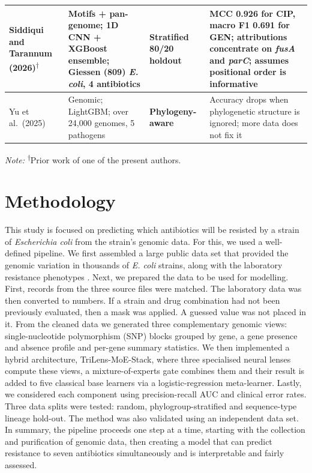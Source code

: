 \documentclass[journal]{IEEEtran}
\begin{document}
\begin{table}[!tb]
\begin{tabular}{|>{\raggedright\arraybackslash}p{2.6cm}|>{\raggedright\arraybackslash}p{4.6cm}|>{\raggedright\arraybackslash}p{2.6cm}|>{\raggedright\arraybackslash}p{6.4cm}|}
Siddiqui and Tarannum (2026)\textsuperscript{$\dagger$} \cite{siddiqui2025amrensemble} & Motifs + pan-genome; 1D CNN + XGBoost ensemble; Giessen (809) \textit{E. coli}, 4 antibiotics & Stratified 80/20 holdout & MCC 0.926 for CIP, macro F1 0.691 for GEN; attributions concentrate on \textit{fusA} and \textit{parC}; assumes positional order is informative \\ \hline
Yu et al.\ (2025) \cite{Yu2025} & Genomic; LightGBM; over 24,000 genomes, 5 pathogens & \textbf{Phylogeny-aware} & Accuracy drops when phylogenetic structure is ignored; more data does not fix it \\ \hline
\end{tabular}
\renewcommand{\arraystretch}{1.0}
\vspace{0.4em}

\noindent\footnotesize\textit{Note:} \textsuperscript{$\dagger$}Prior work of one of
the present authors.
\end{table}

\section{Methodology}
\label{sec:method}

This study is focused on predicting which antibiotics will be resisted by a strain
of \textit{Escherichia coli} from the strain's genomic data. For this, we used a
well-defined pipeline. We first assembled a large public data set that provided the
genomic variation in thousands of \textit{E. coli} strains, along with the
laboratory resistance phenotypes \cite{morin2024ecoli,york2025amr}. Next, we prepared the data to
be used for modelling. First, records from the three source files were matched. The
laboratory data was then converted to numbers. If a strain and drug combination had
not been previously evaluated, then a mask was applied. A guessed value was not
placed in it. From the cleaned data we generated three complementary genomic views:
single-nucleotide polymorphism (SNP) blocks grouped by gene, a gene presence and
absence profile and per-gene summary statistics. We then implemented a hybrid
architecture, TriLens-MoE-Stack, where three specialised neural lenses compute
these views, a mixture-of-experts gate combines them and their result is added to
five classical base learners via a logistic-regression meta-learner. Lastly, we
considered each component using precision-recall AUC and clinical error rates.
Three data splits were tested: random, phylogroup-stratified and sequence-type
lineage hold-out. The method was also validated using an independent data set. In
summary, the pipeline proceeds one step at a time, starting with the collection and
purification of genomic data, then creating a model that can predict resistance to
seven antibiotics simultaneously and is interpretable and fairly assessed.
\end{document}
